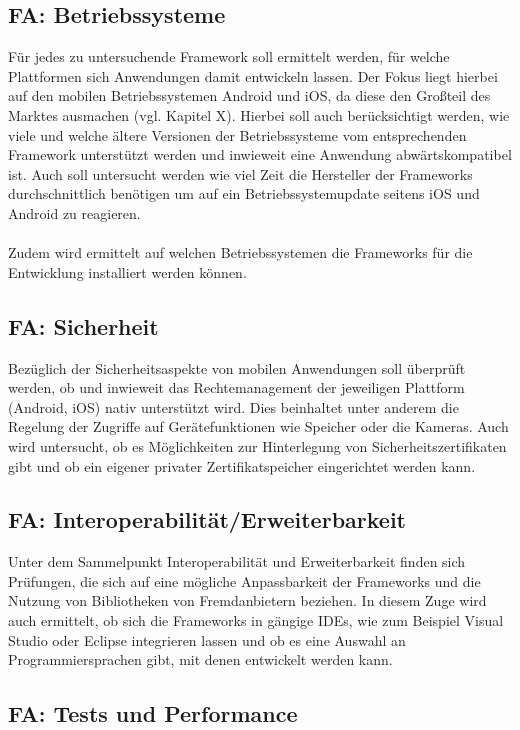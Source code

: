 \subsection{FA: Betriebssysteme}

Für jedes zu untersuchende Framework soll ermittelt werden, für welche Plattformen sich Anwendungen damit entwickeln lassen. Der Fokus liegt hierbei auf den mobilen Betriebssystemen Android und iOS, da diese den Großteil des Marktes ausmachen (vgl. Kapitel X). Hierbei soll auch berücksichtigt werden, wie viele und welche ältere Versionen der Betriebssysteme vom entsprechenden Framework unterstützt werden und inwieweit eine Anwendung abwärtskompatibel ist. Auch soll untersucht werden wie viel Zeit die Hersteller der Frameworks durchschnittlich benötigen um auf ein Betriebssystemupdate seitens iOS und Android zu reagieren.
\\\\
Zudem wird ermittelt auf welchen Betriebssystemen die Frameworks für die Entwicklung installiert werden können.  

\subsection{FA: Sicherheit}

Bezüglich der Sicherheitsaspekte von mobilen Anwendungen soll überprüft werden, ob und inwieweit das Rechtemanagement der jeweiligen Plattform (Android, iOS) nativ unterstützt wird. Dies beinhaltet unter anderem die Regelung der Zugriffe auf Gerätefunktionen wie Speicher oder die Kameras. Auch wird untersucht, ob es Möglichkeiten zur Hinterlegung von Sicherheitszertifikaten gibt und ob ein eigener privater Zertifikatspeicher eingerichtet werden kann. 

\subsection{FA: Interoperabilität/Erweiterbarkeit}

Unter dem Sammelpunkt Interoperabilität und Erweiterbarkeit finden sich Prüfungen, die sich auf eine mögliche Anpassbarkeit der Frameworks und die Nutzung von Bibliotheken von Fremdanbietern beziehen. In diesem Zuge wird auch ermittelt, ob sich die Frameworks in gängige IDEs, wie zum Beispiel Visual Studio oder Eclipse integrieren lassen und ob es eine Auswahl an Programmiersprachen gibt, mit denen entwickelt werden kann.

\subsection{FA: Tests und Performance}

